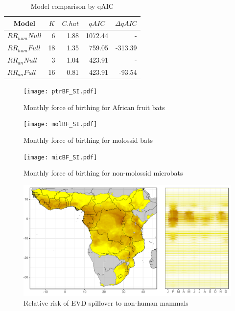\documentclass[9pt,twoside,lineno]{pnas-new}
\begin{document}
\newpage\clearpage
\begin{table}[!h]
    \centering
    \caption{Model comparison by qAIC}
    \label{tab:qAIC}
    \begin{tabular}{l r r r r}
    \multicolumn{1}{c}{Model} & \multicolumn{1}{c}{$K$} & \multicolumn{1}{c}{$C.hat$} & \multicolumn{1}{c}{$qAIC$} & \multicolumn{1}{c}{$\Delta qAIC$}\\
     \hline\hline
$RR_{hum} Null$ & 6 & 1.88 & 1072.44 & - \\
$RR_{hum} Full$ & 18 & 1.35 & 759.05 & -313.39 \\
$RR_{an} Null$ & 3 & 1.04 & 423.91 & - \\
$RR_{an} Full$ & 16 & 0.81 & 423.91 &  -93.54 \\    
    \end{tabular}
\end{table}

\newpage\clearpage
\begin{figure}
    \centering
    \texttt{[image: ptrBF\_SI.pdf]}
    \caption{Monthly force of birthing for African fruit bats}
    \label{fig:ptrBF}
\end{figure}
\FloatBarrier

\newpage\clearpage
\begin{figure}
    \centering
    \texttt{[image: molBF\_SI.pdf]}
    \caption{Monthly force of birthing for molossid bats}
    \label{fig:molBF}
\end{figure}
\FloatBarrier

\newpage\clearpage
\begin{figure}
    \centering
    \texttt{[image: micBF\_SI.pdf]}
    \caption{Monthly force of birthing for non-molossid microbats}
    \label{fig:micBF}
\end{figure}
\FloatBarrier

\newpage\clearpage
\begin{figure}
    \centering
    \includegraphics[width=.8\linewidth]{AnnRisk.pdf}
    \caption{Relative risk of EVD spillover to non-human mammals}
    \label{fig:AnRisk}
\end{figure}
\end{document}
